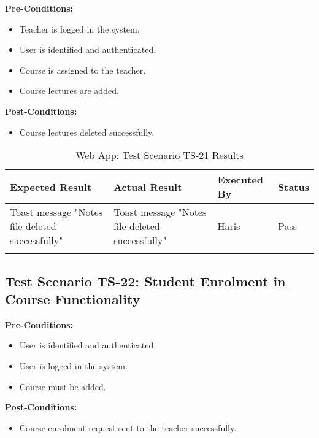 \textbf{Pre-Conditions: }
\begin{itemize}

\item Teacher is logged in the system.
\item User is identified and authenticated.
\item Course is assigned to the teacher.
\item Course lectures are added.

\end{itemize}

\textbf{Post-Conditions: }
\begin{itemize}

\item Course lectures deleted successfully.

\end{itemize}


\bigskip

\begin{longtable}{|p{4cm}|p{4cm}|p{2cm}|p{2cm}|}
\hline
\textbf{Expected Result} & \textbf{Actual Result} & \textbf{Executed By} & \textbf{Status}\\
\hline
Toast message "Notes file deleted successfully" &
Toast message "Notes file deleted successfully" &
Haris &
Pass \\
\hline

\caption{Web App: Test Scenario TS-21 Results}
\end{longtable}


\subsection{Test Scenario TS-22: Student Enrolment in Course Functionality}

\textbf{Pre-Conditions: }
\begin{itemize}

\item User is identified and authenticated.
\item User is logged in the system.
\item Course must be added.

\end{itemize}

\textbf{Post-Conditions: }
\begin{itemize}
\item Course enrolment request sent to the teacher successfully.

\end{itemize}


